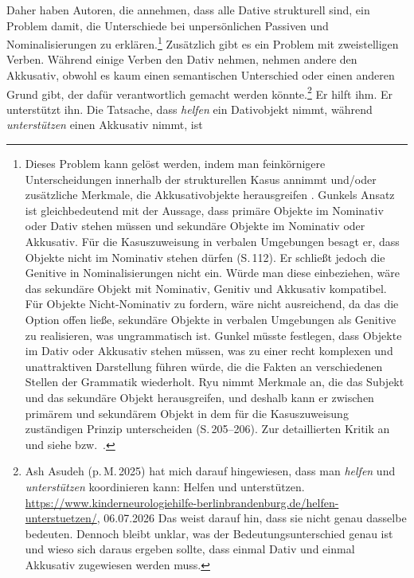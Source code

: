 \noindent
Daher haben Autoren, die annehmen, dass alle Dative strukturell sind, ein Problem damit, die Unterschiede bei
unpersönlichen Passiven und Nominalisierungen zu erklären.\footnote{\label{fn-structural-dative}
  Dieses Problem kann gelöst werden, indem man feinkörnigere Unterscheidungen innerhalb der strukturellen Kasus annimmt
  \citep[]{Gunkel2003b} und/oder zusätzliche Merkmale, die Akkusativobjekte herausgreifen
  \citep[]{Ryu97a}. Gunkels Ansatz ist gleichbedeutend mit der Aussage, dass primäre
  Objekte im Nominativ oder Dativ stehen müssen und sekundäre Objekte im Nominativ oder Akkusativ. Für die Kasuszuweisung in verbalen
  Umgebungen besagt er, dass Objekte nicht im Nominativ stehen dürfen (S.\,112). Er schließt jedoch die
  Genitive in Nominalisierungen nicht ein. Würde man diese einbeziehen, wäre das sekundäre Objekt mit
  Nominativ, Genitiv und Akkusativ kompatibel. Für Objekte Nicht-Nominativ zu fordern, wäre nicht
  ausreichend, da das die Option offen ließe, sekundäre Objekte in verbalen Umgebungen als Genitive zu realisieren,
  was ungrammatisch ist. Gunkel müsste festlegen, dass Objekte
  im Dativ oder Akkusativ stehen müssen, was zu einer recht komplexen und unattraktiven
  Darstellung führen würde, die die Fakten an verschiedenen Stellen der Grammatik wiederholt. Ryu nimmt Merkmale an, die
  das Subjekt und das sekundäre Objekt herausgreifen, und deshalb kann er zwischen primärem
  und sekundärem Objekt in dem für die Kasuszuweisung zuständigen Prinzip unterscheiden (S.\,205--206). Zur
  detaillierten Kritik an  und  siehe 
  bzw.\ .
} Zusätzlich gibt es ein Problem mit zweistelligen Verben. Während
einige Verben den Dativ nehmen, nehmen andere den Akkusativ, obwohl es kaum einen semantischen
Unterschied oder einen anderen Grund gibt, der dafür verantwortlich gemacht werden könnte.\footnote{
  Ash Asudeh (p.\,M.\,2025) hat mich darauf hingewiesen, dass man \emph{helfen} und
  \emph{unterstützen} koordinieren kann:
  \ea
  Helfen und
  unterstützen. \url{https://www.kinderneurologiehilfe-berlinbrandenburg.de/helfen-unterstuetzen/}, 06.07.2026
  \z Das weist darauf hin, dass sie nicht genau dasselbe
  bedeuten. Dennoch bleibt unklar, was der Bedeutungsunterschied genau ist und wieso sich daraus
  ergeben sollte, dass einmal Dativ und einmal Akkusativ zugewiesen werden muss.
}
\eal
\ex 
Er hilft ihm.
\ex 
Er unterstützt ihn.
\zl
Die Tatsache, dass \emph{helfen} ein Dativobjekt nimmt, während \emph{unterstützen} einen Akkusativ nimmt, ist
